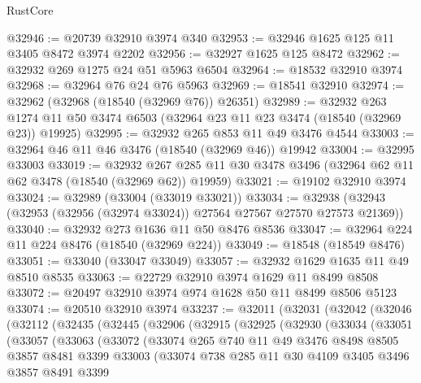 \begin{lexlean}{RustCore}
\begin{coremodule}
@32946 := @20739 @32910 @3974 @340
@32953 := @32946 @1625 @125 @11 @3405 @8472 @3974 @2202
@32956 := @32927 @1625 @125 @8472
@32962 := @32932 @269 @1275 @24 @51 @5963 @6504
@32964 := @18532 @32910 @3974
@32968 := @32964 @76 @24 @76 @5963
@32969 := @18541 @32910
@32974 := @32962 (@32968 (@18540 (@32969 @76)) @26351)
@32989 := @32932
    @263
    @1274
    @11
    @50
    @3474
    @6503
    (@32964 @23 @11 @23 @3474 (@18540 (@32969 @23)) @19925)
@32995 := @32932 @265 @853 @11 @49 @3476 @4544
@33003 := @32964 @46 @11 @46 @3476 (@18540 (@32969 @46)) @19942
@33004 := @32995 @33003
@33019 := @32932
    @267
    @285
    @11
    @30
    @3478
    @3496
    (@32964 @62 @11 @62 @3478 (@18540 (@32969 @62)) @19959)
@33021 := @19102 @32910 @3974
@33024 := @32989 (@33004 (@33019 @33021))
@33034 := @32938 (@32943 (@32953 (@32956 (@32974 @33024)) @27564 @27567 @27570 @27573 @21369))
@33040 := @32932 @273 @1636 @11 @50 @8476 @8536
@33047 := @32964 @224 @11 @224 @8476 (@18540 (@32969 @224))
@33049 := @18548 (@18549 @8476)
@33051 := @33040 (@33047 @33049)
@33057 := @32932 @1629 @1635 @11 @49 @8510 @8535
@33063 := @22729 @32910 @3974 @1629 @11 @8499 @8508
@33072 := @20497 @32910 @3974 @974 @1628 @50 @11 @8499 @8506 @5123
@33074 := @20510 @32910 @3974
@33237 := @32011
    (@32031
      (@32042
        (@32046
          (@32112
            (@32435
              (@32445
                (@32906
                  (@32915
                    (@32925
                      (@32930
                        (@33034
                          (@33051
                            (@33057
                              (@33063
                                (@33072
                                  (@33074
                                    @265
                                    @740
                                    @11
                                    @49
                                    @3476
                                    @8498
                                    @8505
                                    @3857
                                    @8481
                                    @3399
                                    @33003
                                    (@33074
                                      @738
                                      @285
                                      @11
                                      @30
                                      @4109
                                      @3405
                                      @3496
                                      @3857
                                      @8491
                                      @3399

\end{coremodule}
\end{lexlean}
